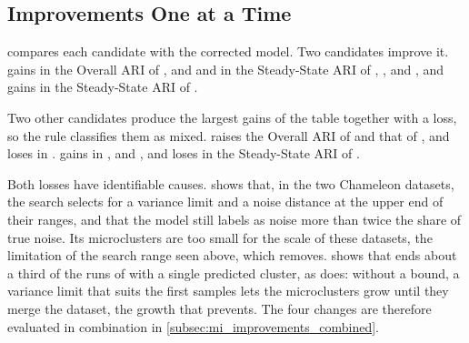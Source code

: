 \subsection{Improvements One at a Time}



 compares each candidate with the corrected model. Two candidates improve it.  gains in the Overall ARI of \BenchmarkTwo,  and  and in the Steady-State ARI of \BenchmarkOne, \BenchmarkTwo,  and , and  gains in the Steady-State ARI of \RandomRBFGeneratorEvents.

Two other candidates produce the largest gains of the table together with a loss, so the rule classifies them as mixed.  raises the Overall ARI of \BenchmarkOne and that of , and loses in \ChameleonDSThree.  gains in \BenchmarkOne, \BenchmarkTwo and \ChameleonDSThree, and loses in the Steady-State ARI of \ChameleonDSFour.




Both losses have identifiable causes.  shows that, in the two Chameleon datasets, the search selects for  a variance limit and a noise distance at the upper end of their ranges, and that the model still labels as noise more than twice the share of true noise. Its microclusters are too small for the scale of these datasets, the limitation of the search range seen above, which  removes.  shows that  ends about a third of the runs of \ChameleonDSFour with a single predicted cluster, as  does: without a bound, a variance limit that suits the first samples lets the microclusters grow until they merge the dataset, the growth that  prevents. The four changes are therefore evaluated in combination in \cref{subsec:mi_improvements_combined}.

